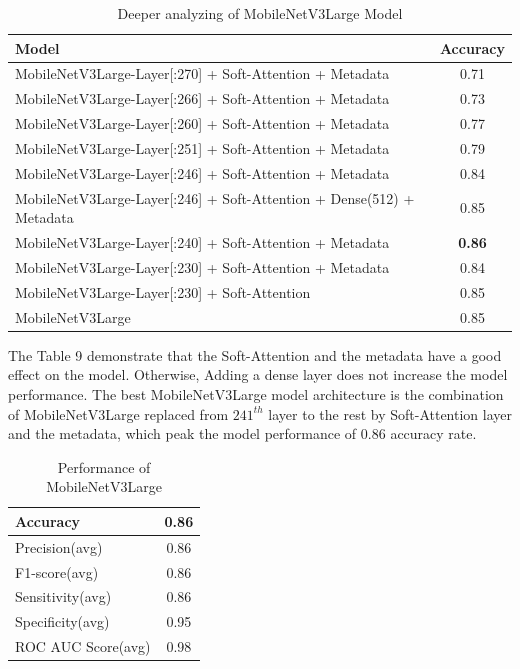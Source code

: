 \documentclass[sensors,article,submit,pdftex,moreauthors]{Definitions/mdpi}
\begin{document}
\begin{table}[ht]
	\centering
	\begin{tabular}{|l | c |}
		\hline
		Model & Accuracy\\
		\hline
		MobileNetV3Large-Layer[:270] + Soft-Attention + Metadata & 0.71 \\
		\hline
		MobileNetV3Large-Layer[:266] + Soft-Attention + Metadata  & 0.73 \\
		\hline
		MobileNetV3Large-Layer[:260] + Soft-Attention + Metadata  & 0.77 \\
		\hline
		MobileNetV3Large-Layer[:251] + Soft-Attention + Metadata  & 0.79 \\
		\hline
		MobileNetV3Large-Layer[:246] + Soft-Attention + Metadata  & 0.84 \\
		\hline
		MobileNetV3Large-Layer[:246] + Soft-Attention + Dense(512) + Metadata & 0.85 \\
		\hline
		MobileNetV3Large-Layer[:240] + Soft-Attention + Metadata  & \textbf{0.86}\\
		\hline
		MobileNetV3Large-Layer[:230] + Soft-Attention + Metadata  & 0.84 \\
		\hline
		MobileNetV3Large-Layer[:230] + Soft-Attention & 0.85 \\ 
		\hline
		MobileNetV3Large & 0.85 \\ 
		\hline
	\end{tabular}
	\caption{Deeper analyzing of MobileNetV3Large Model}
	\label{table:8}
\end{table}
\FloatBarrier
The Table 9 demonstrate that the Soft-Attention and the metadata have a good effect on the model. Otherwise, Adding a dense layer does not increase the model performance. The best MobileNetV3Large model architecture is the combination of MobileNetV3Large replaced from $241^{th}$ layer to the rest by Soft-Attention layer and the metadata, which peak the model performance of $0.86$ accuracy rate. 
\FloatBarrier
\begin{table}[ht]
	\centering
	\begin{tabular}{| l | c |}
		\hline
		Accuracy & 0.86\\
		\hline
		Precision(avg) & 0.86\\
		\hline
		F1-score(avg) & 0.86\\
		\hline
		Sensitivity(avg) & 0.86\\
		\hline
		Specificity(avg) & 0.95\\
		\hline
		ROC AUC Score(avg) & 0.98\\
		\hline
	\end{tabular}
	\caption{Performance of MobileNetV3Large}
	\label{table:9}
\end{table}
\end{document}

